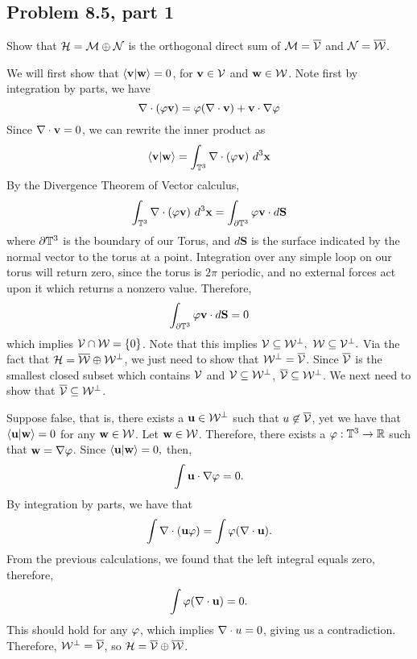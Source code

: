 \subsection{Problem 8.5, part 1}
Show that $\mathcal{H} = \mathcal{M} \oplus \mathcal{N}$ is the orthogonal direct sum of $\mathcal{M} = \overline{\mathcal{V}}$ and $\mathcal{N} = \overline{\mathcal{W}}$.
\partbreak
\begin{solution}

    We will first show that $\braket{\textbf{v}}{\textbf{w}} = 0$, for $\textbf{v} \in \mathcal{V}$ and $\textbf{w} \in \mathcal{W}$. Note first by integration by parts, we have
    \[\nabla \cdot (\varphi\textbf{v}) = \varphi(\nabla \cdot \textbf{v}) + \textbf{v}\cdot \nabla\varphi\]
    Since $\nabla \cdot \textbf{v} = 0$, we can rewrite the inner product as 
    \[\braket{\textbf{v}}{\textbf{w}} = \int_{\mathbb{T}^3} \nabla \cdot(\varphi \textbf{v}) \ d^3\textbf{x}\]
    By the Divergence Theorem of Vector calculus, 
    \[\int_{\mathbb{T}^3} \nabla \cdot(\varphi \textbf{v}) \ d^3\textbf{x} = \int_{\partial \mathbb{T}^3} \varphi\textbf{v} \cdot d\textbf{S}\]
    where $\partial \mathbb{T}^3$ is the boundary of our Torus, and $d\textbf{S}$ is the surface indicated by the normal vector to the torus at a point. Integration over any simple loop on our torus will return zero, since the torus is $2\pi$ periodic, and no external forces act upon it which returns a nonzero value. Therefore, 
    \[\int_{\partial \mathbb{T}^3} \varphi\textbf{v} \cdot d\textbf{S} = 0\]
    which implies $\mathcal{V} \cap \mathcal{W} = \{0\}$. Note that this implies $\mathcal{V} \subseteq \mathcal{W}^\perp, \ \mathcal{W} \subseteq \mathcal{V}^\perp.$ Via the fact that $\mathcal{H} = \overline{\mathcal{W}} \oplus \mathcal{W}^\perp$, we just need to show that $\mathcal{W}^\perp = \overline{\mathcal{V}}$. Since $\overline{\mathcal{V}}$ is the smallest closed subset which contains $\mathcal{V}$ and $\mathcal{V} \subseteq \mathcal{W}^\perp$, $\overline{\mathcal{V}} \subseteq \mathcal{W}^\perp$. We next need to show that $\overline{\mathcal{V}} \subseteq \mathcal{W}^\perp$. \par
    
    \hop
    Suppose false, that is, there exists a $\textbf{u} \in \mathcal{W}^\perp$ such that $u \not \in \overline{\mathcal{V}}$, yet we have that $\braket{\textbf{u}}{\textbf{w}} = 0$ for any $\textbf{w} \in \mathcal{W}$. Let $\textbf{w} \in \mathcal{W}$. Therefore, there exists a $\varphi : \mathbb{T}^3 \rightarrow \mathbb{R}$ such that $\textbf{w} = \nabla \varphi$. Since $\braket{\textbf{u}}{\textbf{w}} = 0,$ then,
    \[\int \textbf{u} \cdot \nabla \varphi = 0.\]
    By integration by parts, we have that 
    \[\int \nabla \cdot (\textbf{u}\varphi) = \int \varphi(\nabla \cdot \textbf{u}).\]
    From the previous calculations, we found that the left integral equals zero, therefore, 
    \[\int \varphi (\nabla \cdot \textbf{u}) = 0.\]
    This should hold for any $\varphi$, which implies $\nabla \cdot u = 0$, giving us a contradiction. Therefore, $\mathcal{W}^\perp = \overline{\mathcal{V}}$, so $\mathcal{H} = \overline{\mathcal{V}} \oplus \overline{\mathcal{W}}$.
\end{solution}

